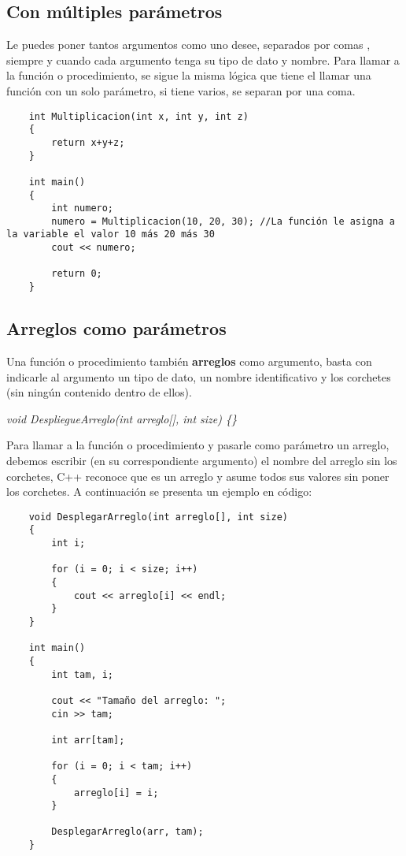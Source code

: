 \subsection{Con múltiples parámetros}
Le puedes poner tantos argumentos como uno desee, separados por comas , siempre y cuando cada argumento tenga su tipo de dato y nombre. Para llamar a la función o procedimiento, se sigue la misma lógica que tiene el llamar una función con un solo parámetro, si tiene varios, se separan por una coma. 
\begin{lstlisting}
    int Multiplicacion(int x, int y, int z)
    {
        return x+y+z;
    }
    
    int main()
    {
        int numero;
        numero = Multiplicacion(10, 20, 30); //La función le asigna a la variable el valor 10 más 20 más 30
        cout << numero;
        
        return 0;
    }
\end{lstlisting}

\subsection{Arreglos como parámetros}
Una función o procedimiento también \textbf{arreglos} como argumento, basta con indicarle al argumento un tipo de dato, un nombre identificativo y los corchetes (sin ningún contenido dentro de ellos).\begin{center}\textit{void DespliegueArreglo(int arreglo[], int size) \{\}}\end{center}
Para llamar a la función o procedimiento y pasarle como parámetro un arreglo, debemos escribir (en su correspondiente argumento) el nombre del arreglo sin los corchetes, C++ reconoce que es un arreglo y asume todos sus valores sin poner los corchetes. A continuación se presenta un ejemplo en código:
\begin{lstlisting}
    void DesplegarArreglo(int arreglo[], int size)
    {
        int i;
        
        for (i = 0; i < size; i++)
        {
            cout << arreglo[i] << endl;
        }
    }
    
    int main()
    {
        int tam, i;
        
        cout << "Tamaño del arreglo: ";
        cin >> tam;
        
        int arr[tam];
        
        for (i = 0; i < tam; i++)
        {
            arreglo[i] = i;
        }
        
        DesplegarArreglo(arr, tam);
    }
\end{lstlisting}

